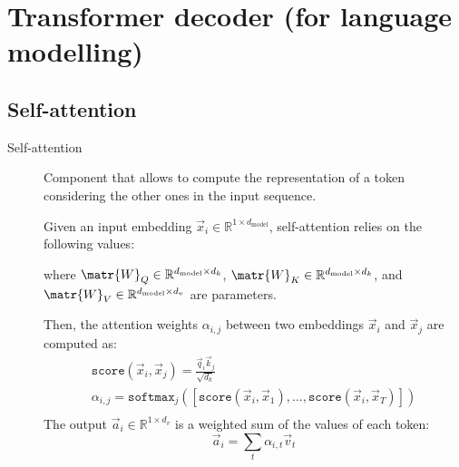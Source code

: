 \section{Transformer decoder (for language modelling)}


\subsection{Self-attention}

\begin{description}
    \item[Self-attention] 
        Component that allows to compute the representation of a token considering the other ones in the input sequence. 

        Given an input embedding $\vec{x}_i \in \mathbb{R}^{1 \times d_\text{model}}$, self-attention relies on the following values:
        where $\matr{W}_Q \in \mathbb{R}^{d_\text{model} \times d_k}$, $\matr{W}_K \in \mathbb{R}^{d_\text{model} \times d_k}$, and $\matr{W}_V \in \mathbb{R}^{d_\text{model} \times d_v}$ are parameters.

        Then, the attention weights $\alpha_{i,j}$ between two embeddings $\vec{x}_i$ and $\vec{x}_j$ are computed as:
        \[
            \begin{gathered}
                \texttt{score}(\vec{x}_i, \vec{x}_j) = \frac{\vec{q}_i \vec{k}_j}{\sqrt{d_k}} \\
                \alpha_{i,j} = \texttt{softmax}_j\left( \left[\texttt{score}(\vec{x}_i, \vec{x}_1), \dots, \texttt{score}(\vec{x}_i, \vec{x}_T)\right] \right) \\
            \end{gathered}
        \]
        The output $\vec{a}_i \in \mathbb{R}^{1 \times d_v}$ is a weighted sum of the values of each token:
        \[ \vec{a}_i = \sum_{t} \alpha_{i,t} \vec{v}_t \]


\end{description}
